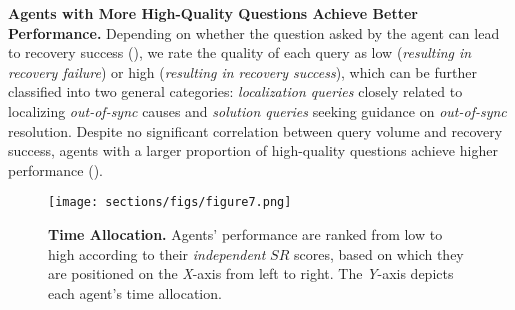 \textbf{Agents with More High-Quality Questions Achieve Better Performance.} 
Depending on whether the question asked by the agent can lead to recovery success (), we rate the quality of each query as low (\textit{resulting in recovery failure}) or high (\textit{resulting in recovery success}), which can be further classified into two general categories: \textit{\textcolor{fig7_blue}{localization queries}} closely related to localizing \textit{out-of-sync} causes and \textit{\textcolor{fig7_salmon}{solution queries}} seeking guidance on \textit{out-of-sync} resolution. 
Despite no significant correlation between query volume and recovery success, agents with a larger proportion of high-quality questions
achieve higher performance ().



\begin{figure*}[!t]
\begin{center}
\begin{small}
\vspace{-0.5em}
    \texttt{[image: sections/figs/figure7.png]}
    \vspace{-1.8em}
    \caption{\textbf{Time Allocation.} Agents' performance are ranked from low to high according to their \textit{independent} $SR$ scores, based on which they are positioned on the \textit{X}-axis from left to right. The \textit{Y}-axis depicts each agent's time allocation.}
    \vspace{-1.5em}  %
    \label{fig:figure 7 (Time Allocation)}
\end{small}
\end{center}
\end{figure*}












